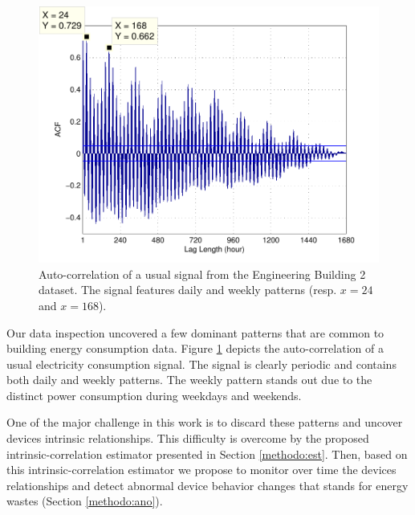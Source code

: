 \begin{figure}[t!]
\begin{center}
\includegraphics[width=.45\textwidth]{img/acf_101A1_GHP-eps-converted-to.pdf}
\caption{Auto-correlation of a usual signal from the Engineering Building 2 dataset.
The signal features daily and weekly patterns (resp. $x=24$ and $x=168$).}
\label{fig:autocorr}
\end{center}
\end{figure}

Our data inspection uncovered a few dominant patterns that are common to building energy consumption data.
Figure \ref{fig:autocorr} depicts the auto-correlation of a usual electricity consumption signal.
The signal is clearly periodic and contains both daily and weekly patterns.
The weekly pattern stands out due to the distinct power consumption during weekdays and weekends.

One of the major challenge in this work is to discard these patterns and uncover devices intrinsic relationships.
This difficulty is overcome by the proposed intrinsic-correlation estimator presented in Section \ref{methodo:est}.
Then, based on this intrinsic-correlation estimator we propose to monitor over time the devices relationships and detect abnormal device behavior changes that stands for energy wastes (Section \ref{methodo:ano}).
